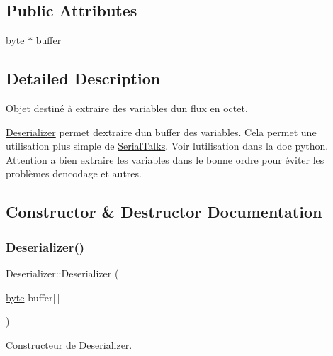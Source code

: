 \subsection*{Public Attributes}
\begin{DoxyCompactItemize}
\item 
\hyperlink{serialutils_8h_a0c8186d9b9b7880309c27230bbb5e69d}{byte} $\ast$ \hyperlink{struct_deserializer_a37f4bae0d8a61c6c556ba3e90a10f0c4}{buffer}
\end{DoxyCompactItemize}


\subsection{Detailed Description}
Objet destiné à extraire des variables d\textquotesingle{}un flux en octet. 

\hyperlink{struct_deserializer}{Deserializer} permet d\textquotesingle{}extraire d\textquotesingle{}un buffer des variables. Cela permet une utilisation plus simple de \hyperlink{class_serial_talks}{Serial\+Talks}. Voir l\textquotesingle{}utilisation dans la doc python. Attention a bien extraire les variables dans le bonne ordre pour éviter les problèmes d\textquotesingle{}encodage et autres. 

\subsection{Constructor \& Destructor Documentation}
\mbox{\label{struct_deserializer_ae6463833d115113e2d7ed91c79d0c988}} 
\subsubsection{\texorpdfstring{Deserializer()}{Deserializer()}}
{\footnotesize\ttfamily Deserializer\+::\+Deserializer (\begin{DoxyParamCaption}\item[{\hyperlink{serialutils_8h_a0c8186d9b9b7880309c27230bbb5e69d}{byte}}]{buffer\mbox{[}$\,$\mbox{]} }\end{DoxyParamCaption})\hspace{0.3cm}{\ttfamily [inline]}}



Constructeur de \hyperlink{struct_deserializer}{Deserializer}. 


